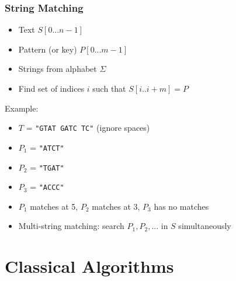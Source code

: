 \documentclass[
	11pt, %
]{beamer}
\begin{document}

\begin{frame}
    \frametitle{String Matching}
    \begin{itemize}
        \item Text $S[0...n-1]$
        \item Pattern (or key) $P[0...m-1]$
        \item Strings from alphabet $\Sigma$
        \item Find set of indices $i$ such that $S[i..i+m] = P$
    \end{itemize}
    Example:
    \begin{itemize}
        \item $T$ = \texttt{"GTAT GATC TC"} (ignore spaces)
        \item $P_1$ = \texttt{"ATCT"}
        \item $P_2$ = \texttt{"TGAT"}
        \item $P_3$ = \texttt{"ACCC"}
        \item $P_1$ matches at 5, $P_2$ matches at 3, $P_3$ has no matches
    \end{itemize}
    \bigskip
    \begin{itemize}
        \item Multi-string matching: search $P_1, P_2, ...$ in $S$ simultaneously
    \end{itemize}
\end{frame}


\section{Classical Algorithms}
\end{document}
